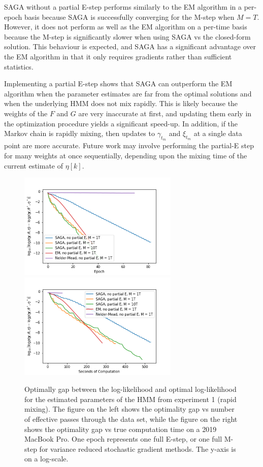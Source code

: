 SAGA without a partial E-step performs similarly to the EM algorithm in a per-epoch basis because SAGA is successfully converging for the M-step when $M = T$. However, it does not perform as well as the EM algorithm on a per-time basis because the M-step is significantly slower when using SAGA vs the closed-form solution. This behaviour is expected, and SAGA has a significant advantage over the EM algorithm in that it only requires gradients rather than sufficient statistics.

Implementing a partial E-step shows that SAGA can outperform the EM algorithm when the parameter estimates are far from the optimal solutions and when the underlying HMM does not mix rapidly. This is likely because the weights of the $F$ and $G$ are very inaccurate at first, and updating them early in the optimization procedure yields a significant speed-up. In addition, if the Markov chain is rapidly mixing, then updates to $\gamma_{t_m}$ and $\xi_{t_m}$ at a single data point are more accurate. Future work may involve performing the partial-E step for many weights at once sequentially, depending upon the mixing time of the current estimate of $\eta[k]$.

\begin{figure}
    \centering
    \includegraphics[width=3in]{../plt/log-like_v_epoch_exp_1.png}
    \includegraphics[width=3in]{../plt/log-like_v_time_exp_1.png}
    \caption{Optimally gap between the log-likelihood and optimal log-likelihood for the estimated parameters of the HMM from experiment 1 (rapid mixing). The figure on the left shows the optimality gap vs number of effective passes through the data set, while the figure on the right shows the optimality gap vs true computation time on a 2019 MacBook Pro. One epoch represents one full E-step, or one full M-step for variance reduced stochastic gradient methods. The y-axis is on a log-scale.}
    \label{fig:exp1_ll}
\end{figure}

